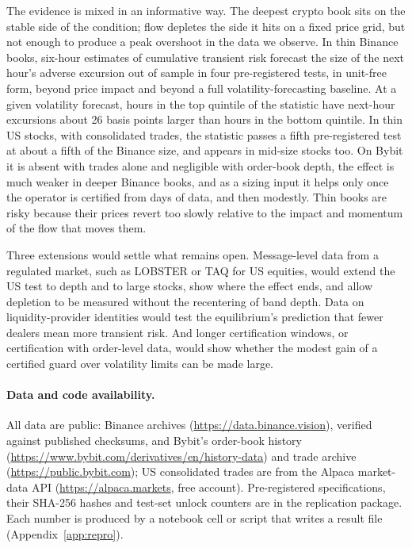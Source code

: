 \documentclass[12pt]{article}
\theoremstyle{definition}
\theoremstyle{remark}
\begin{document}
The evidence is mixed in an informative way. The deepest crypto book sits on the stable side of the condition; flow depletes the side it hits on a fixed price grid, but not enough to produce a peak overshoot in the data we observe. In thin Binance books, six-hour estimates of cumulative transient risk forecast the size of the next hour's adverse excursion out of sample in four pre-registered tests, in unit-free form, beyond price impact and beyond a full volatility-forecasting baseline. At a given volatility forecast, hours in the top quintile of the statistic have next-hour excursions about 26 basis points larger than hours in the bottom quintile. In thin US stocks, with consolidated trades, the statistic passes a fifth pre-registered test at about a fifth of the Binance size, and appears in mid-size stocks too. On Bybit it is absent with trades alone and negligible with order-book depth, the effect is much weaker in deeper Binance books, and as a sizing input it helps only once the operator is certified from days of data, and then modestly. Thin books are risky because their prices revert too slowly relative to the impact and momentum of the flow that moves them.

Three extensions would settle what remains open. Message-level data from a regulated market, such as LOBSTER or TAQ for US equities, would extend the US test to depth and to large stocks, show where the effect ends, and allow depletion to be measured without the recentering of band depth. Data on liquidity-provider identities would test the equilibrium's prediction that fewer dealers mean more transient risk. And longer certification windows, or certification with order-level data, would show whether the modest gain of a certified guard over volatility limits can be made large.

\paragraph{Data and code availability.} All data are public: Binance archives (\url{https://data.binance.vision}), verified against published checksums, and Bybit's order-book history (\url{https://www.bybit.com/derivatives/en/history-data}) and trade archive (\url{https://public.bybit.com}); US consolidated trades are from the Alpaca market-data API (\url{https://alpaca.markets}, free account). Pre-registered specifications, their SHA-256 hashes and test-set unlock counters are in the replication package. Each number is produced by a notebook cell or script that writes a result file (Appendix~\ref{app:repro}).
\end{document}
